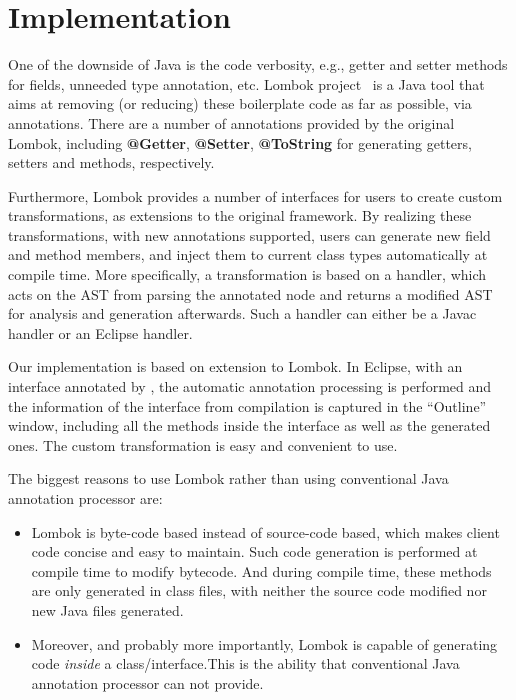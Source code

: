 \section{Implementation}
\begin{comment}
Haoyuan

discuss implementation in lombok; and limitations.

\bruno{The implementation does not support separate compilation yet. Can we fix this?}

\haoyuan{http://notatube.blogspot.hk/2010/12/project-lombok-creating-custom.html}

\haoyuan{https://blog.frankel.ch/lombok-reduces-your-boilerplate-code}

\haoyuan{https://projectlombok.org/}
\end{comment}

One of the downside of Java is the code verbosity, e.g., getter and setter
methods for fields, unneeded type annotation, etc. Lombok project~\cite{} is a
Java tool that aims at removing (or reducing) these boilerplate code as far as
possible, via annotations. There are a number of annotations provided by the
original Lombok, including \textbf{@Getter}, \textbf{@Setter},
\textbf{@ToString} for generating getters, setters and  methods,
respectively.

Furthermore, Lombok provides a number of interfaces for users to create custom
transformations, as extensions to the original framework. By realizing these
transformations, with new annotations supported, users can generate new field
and method members, and inject them to current class types automatically at
compile time. More specifically, a transformation is based on a handler, which
acts on the AST from parsing the annotated node and returns a modified AST for
analysis and generation afterwards. Such a handler can either be a Javac handler
or an Eclipse handler.

Our implementation is based on extension to Lombok. In Eclipse, with an
interface annotated by \mixin, the automatic annotation processing is performed
and the information of the interface from compilation is captured in the
``Outline'' window, including all the methods inside the interface as well as
the generated ones. The custom transformation is easy and convenient to use.

The biggest reasons to use Lombok rather than using conventional Java annotation
processor are:
\begin{itemize}
\item Lombok is byte-code based instead of source-code based, which makes client
  code concise and easy to maintain. Such code generation is performed at
  compile time to modify bytecode. And during compile time, these methods are
  only generated in class files, with neither the source code modified nor new
  Java files generated.
\item Moreover, and probably more importantly, Lombok is capable of generating
  code \emph{inside} a class/interface.This is the ability that conventional
  Java annotation processor can not provide.
\end{itemize}


